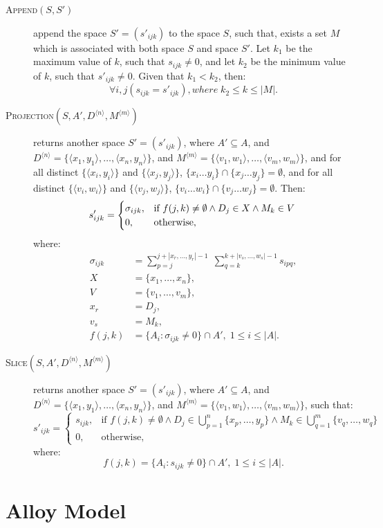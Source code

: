 \documentclass{article}
\begin{document}
\begin{description}
	\item[\textsc{Append}$(S,S')$] append the space
	$S'=\left(s'_{ijk}\right)$ to the space $S$,
		such that, exists a set $M$ which is associated with both space $S$ and
		space $S'$. Let $k_1$ be the maximum value of $k$, such that
		$s_{ijk} \neq 0$, and let $k_2$ be the minimum value of $k$,
		such that $s'_{ijk} \neq 0$. Given that $k_1 < k_2$, then:
		\[
			\forall i,j\left(s_{ijk} = s'_{ijk}\right), where \; k_2 \leq k \leq |M|.
		\]

	\item[\textsc{Projection}$(S, A', D^{\langle n \rangle}, M^{\langle m \rangle})$] 
		returns another space $S'=\left(s'_{ijk}\right)$,
		where $A' \subseteq A$, and $D^{\langle n \rangle} = 
		\{\langle x_1, y_1 \rangle, \ldots, \langle x_n, y_n \rangle\}$, and
		$M^{\langle m \rangle} = 
		\{\langle v_1, w_1 \rangle, \ldots, \langle v_m, w_m \rangle \}$, and
		for all distinct $\{\langle x_i, y_i \rangle\}$ and $\{\langle x_j, y_j \rangle\}$,
		$\{x_i \ldots y_i\} \cap \{x_j \ldots y_j\} = \emptyset$, and
		for all distinct $\{\langle v_i, w_i \rangle\}$ and $\{\langle v_j, w_j \rangle\}$,
		$\{v_i \ldots w_i\} \cap \{v_j \ldots w_j\} = \emptyset$. Then:
		\[
			s'_{ijk} = 
			\begin{cases}
				\sigma_{ijk}, & 
					\text{if } f(j, k) \neq \emptyset \land 
						D_j \in X \land M_k \in V \\
				0, & \text{otherwise},
			\end{cases} \\
		\]
		where:
		\begin{align*}
			\sigma_{ijk} &= \sum_{p=j}^{j+|x_r, \ldots, y_r|-1} \;
				{\sum_{q=k}^{k+|v_s, \ldots, w_s|-1}{s_{ipq}}}, \\
			X &= \{ x_1, \ldots, x_n \}, \\
			V &= \{ v_1, \ldots, v_m \}, \\
			x_r &= D_j, \\
			v_s &= M_k, \\
			f(j,k) &= \{ A_i : \sigma_{ijk} \neq 0 \} \cap A', \; 1 \leq i \leq |A|.
		\end{align*}

	\item[\textsc{Slice}$(S, A', D^{\langle n \rangle}, M^{\langle m \rangle})$] 
		returns another space $S'=\left(s'_{ijk}\right)$, 
		where $A' \subseteq A $, and $D^{\langle n \rangle} = 
		\{\langle x_1, y_1 \rangle, \ldots, \langle x_n, y_n \rangle\}$, and
		$M^{\langle m \rangle} = 
		\{\langle v_1, w_1 \rangle, \ldots, \langle v_m, w_m \rangle \}$,
		such that:
		\[
			s'_{ijk} = 
			\begin{cases}
				s_{ijk}, & \text{if } 
					f(j, k) \neq \emptyset \land
					D_j \in \bigcup\limits_{p=1}^{n} \{ x_p, \ldots, y_p \} \land 
					M_k \in \bigcup\limits_{q=1}^{m} \{ v_q, \ldots, w_q \} \\
				0, & \text{otherwise},
			\end{cases}
		\]
		where:
		\[
			f(j,k) = \{ A_i : s_{ijk} \neq 0 \} \cap A', \; 1 \leq i \leq |A|.
		\]

\end{description}

\section{Alloy Model} %
\label{sec:alloy_model}


\end{document}
